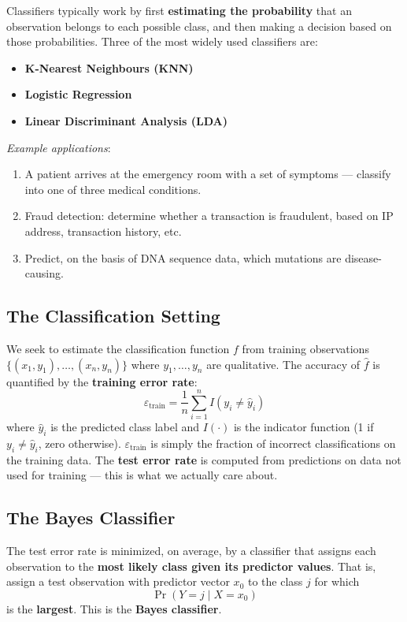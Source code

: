 \documentclass[11pt,a4paper]{article}
\theoremstyle{definition}
\theoremstyle{plain}
\theoremstyle{remark}
\begin{document}
Classifiers typically work by first \textbf{estimating the probability} that an observation belongs to each possible class, and then making a decision based on those probabilities. Three of the most widely used classifiers are:
\begin{itemize}
    \item \textbf{K-Nearest Neighbours (KNN)}
    \item \textbf{Logistic Regression}
    \item \textbf{Linear Discriminant Analysis (LDA)}
\end{itemize}

\textit{Example applications}:
\begin{enumerate}
    \item A patient arrives at the emergency room with a set of symptoms — classify into one of three medical conditions.
    \item Fraud detection: determine whether a transaction is fraudulent, based on IP address, transaction history, etc.
    \item Predict, on the basis of DNA sequence data, which mutations are disease-causing.
\end{enumerate}

\subsection{The Classification Setting}

We seek to estimate the classification function $f$ from training observations $\{(x_1, y_1), \ldots, (x_n, y_n)\}$ where $y_1, \ldots, y_n$ are qualitative. The accuracy of $\hat{f}$ is quantified by the \textbf{training error rate}:
\[
    \varepsilon_{\text{train}} = \frac{1}{n} \sum_{i=1}^{n} I(y_i \neq \hat{y}_i)
\]
where $\hat{y}_i$ is the predicted class label and $I(\cdot)$ is the indicator function (1 if $y_i \neq \hat{y}_i$, zero otherwise). $\varepsilon_{\text{train}}$ is simply the fraction of incorrect classifications on the training data. The \textbf{test error rate} is computed from predictions on data not used for training — this is what we actually care about.

\subsection{The Bayes Classifier}

\begin{tcolorbox}[colback=blue!5!white,colframe=blue!75!black,title=\textbf{The Bayes Classifier}]
The test error rate is minimized, on average, by a classifier that assigns each observation to the \textbf{most likely class given its predictor values}. That is, assign a test observation with predictor vector $x_0$ to the class $j$ for which
\[
    \Pr(Y = j \mid X = x_0)
\]
is the \textbf{largest}. This is the \textbf{Bayes classifier}.
\end{tcolorbox}
\end{document}
